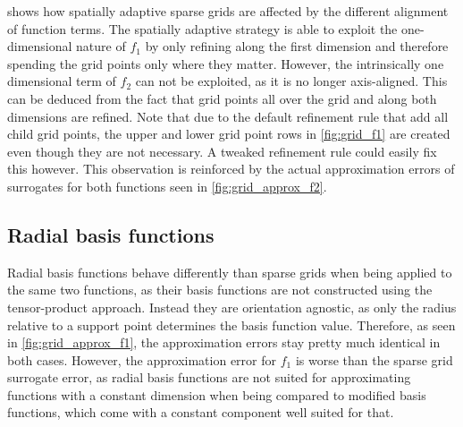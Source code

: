 \documentclass[
  a4paper,  %
  twoside,  %
  bibliography=totoc,
  headsepline,
  cleardoublepage=empty,
  parskip=half,
  draft=false
]{scrbook}
\begin{document}
%
 shows how spatially adaptive sparse grids are affected by the different alignment of function terms.
The spatially adaptive strategy is able to exploit the one-dimensional nature of $f_1$ by only refining along the first dimension and therefore spending the grid points only where they matter.
However, the intrinsically one dimensional term of $f_2$ can not be exploited, as it is no longer axis-aligned.
This can be deduced from the fact that grid points all over the grid and along both dimensions are refined.
Note that due to the default refinement rule that add all child grid points, the upper and lower grid point rows in \cref{fig:grid_f1} are created even though they are not necessary.
A tweaked refinement rule could easily fix this however.
This observation is reinforced by the actual approximation errors of surrogates for both functions seen in \cref{fig:grid_approx_f2}.

\subsection{Radial basis functions}

Radial basis functions behave differently than sparse grids when being applied to the same two functions, as their basis functions are not constructed using the tensor-product approach.
Instead they are orientation agnostic, as only the radius relative to a support point determines the basis function value.
Therefore, as seen in \cref{fig:grid_approx_f1}, the approximation errors stay pretty much identical in both cases.
However, the approximation error for $f_1$ is worse than the sparse grid surrogate error, as radial basis functions are not suited for approximating functions with a constant dimension when being compared to modified basis functions, which come with a constant component well suited for that.
\end{document}
